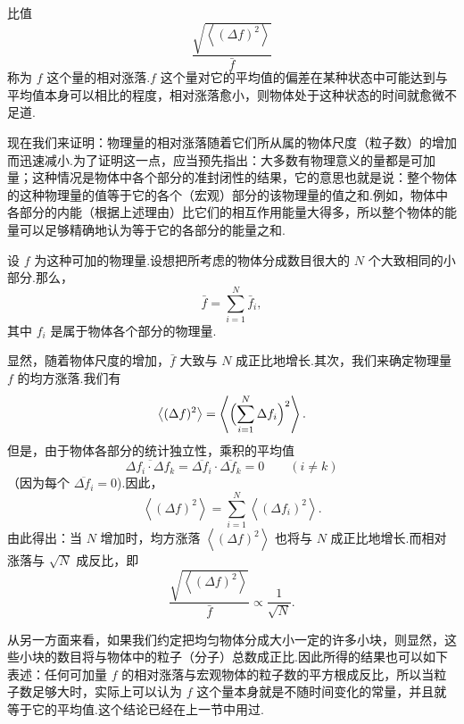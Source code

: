 比值
\begin{equation*}
  \frac{\sqrt{\left\langle(\Delta f)^2\right\rangle}}{\bar{f}}
\end{equation*}
称为 $f$ 这个量的相对涨落.$f$ 这个量对它的平均值的偏差在某种状态中可能达到与平均值本身可以相比的程度，相对涨落愈小，则物体处于这种状态的时间就愈微不足道.

现在我们来证明：物理量的相对涨落随着它们所从属的物体尺度（粒子数）的增加而迅速减小.为了证明这一点，应当预先指出：大多数有物理意义的量都是可加量；这种情况是物体中各个部分的准封闭性的结果，它的意思也就是说：整个物体的这种物理量的值等于它的各个（宏观）部分的该物理量的值之和.例如，物体中各部分的内能（根据上述理由）比它们的相互作用能量大得多，所以整个物体的能量可以足够精确地认为等于它的各部分的能量之和.

设 $f$ 为这种可加的物理量.设想把所考虑的物体分成数目很大的 $N$ 个大致相同的小部分.那么，
\begin{equation*}
  \bar{f}=\sum_{i=1}^{N}\bar{f}_i,
\end{equation*}
其中 $f_i$ 是属于物体各个部分的物理量.

显然，随着物体尺度的增加，$\bar{f}$ 大致与 $N$ 成正比地增长.其次，我们来确定物理量 $f$ 的均方涨落.我们有
\begin{equation*}
  \left\langle(\Delta f)^2\right\rangle
  =\left\langle\Bigl(\sum_{i=1}^{N}\Delta f_i\Bigr)^2\right\rangle.
\end{equation*}
但是，由于物体各部分的统计独立性，乘积的平均值
\begin{equation*}
  \overline{\Delta f_i\cdot\Delta f_k}
  =\overline{\Delta f_i}\cdot\overline{\Delta f_k}=0
  \qquad(i\neq k)
\end{equation*}
（因为每个 $\overline{\Delta f_i}=0$).因此，
\begin{equation}
  \left\langle(\Delta f)^2\right\rangle
  =\sum_{i=1}^{N}\left\langle(\Delta f_i)^2\right\rangle.
\end{equation}
由此得出：当 $N$ 增加时，均方涨落 $\left\langle(\Delta f)^2\right\rangle$ 也将与 $N$ 成正比地增长.而相对涨落与 $\sqrt{N}$ 成反比，即
\begin{equation}
  \frac{\sqrt{\left\langle(\Delta f)^2\right\rangle}}{\bar{f}}
  \propto\frac{1}{\sqrt{N}}.
\end{equation}

从另一方面来看，如果我们约定把均匀物体分成大小一定的许多小块，则显然，这些小块的数目将与物体中的粒子（分子）总数成正比.因此所得的结果也可以如下表述：任何可加量 $f$ 的相对涨落与宏观物体的粒子数的平方根成反比，所以当粒子数足够大时，实际上可以认为 $f$ 这个量本身就是不随时间变化的常量，并且就等于它的平均值.这个结论已经在上一节中用过.

